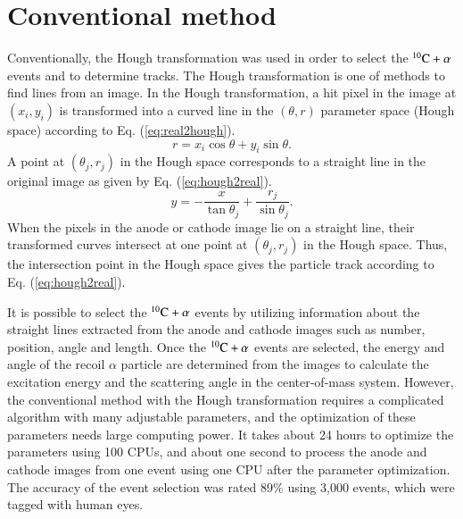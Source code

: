 \documentclass{jps-cp}
\begin{document}
\section{Conventional method}
Conventionally, the Hough transformation was used in order to
select the ${}^{10}\rm{C}+\alpha$ events and to determine tracks.
The Hough transformation is one of methods to find lines from an image.
In the Hough transformation, a hit pixel in the image at $(x_{i}, y_{i})$ is transformed into
a curved line in the $(\theta, r)$ parameter space (Hough space)
according to Eq. (\ref{eq:real2hough}).
\begin{equation}
  \label{eq:real2hough}
  r = x_{i}\cos\theta+y_{i}\sin\theta. 
\end{equation}
A point at $(\theta_{j}, r_{j})$ in the Hough space corresponds to a straight line
in the original image as given by Eq. (\ref{eq:hough2real}).
\begin{equation}
  \label{eq:hough2real}
  y = -\frac{x}{\tan\theta_{j}}+\frac{r_{j}}{\sin\theta_{j}}. 
\end{equation}
When the pixels in the anode or cathode image lie on a straight line,
their transformed curves intersect at one point at $(\theta_{j}, r_{j})$ in the Hough space.
Thus, the intersection point in the Hough space gives the particle track according to Eq. (\ref{eq:hough2real}).

It is possible to select the ${}^{10}\rm{C}+\alpha$ events by
utilizing information about the straight lines extracted from the anode and cathode images such as
number, position, angle and length.
Once the ${}^{10}\rm{C}+\alpha$ events are selected, the energy and angle of the recoil $\alpha$ particle
are determined from the images to calculate the excitation energy and the scattering angle in the center-of-mass system.
However, the conventional method with the Hough transformation requires a complicated algorithm with many adjustable parameters,
and the optimization of these parameters needs large computing power.
It takes about 24 hours to optimize the parameters using 100 CPUs, 
and about one second to process the anode and cathode images from one event using one CPU after the parameter optimization.
The accuracy of the event selection was rated 89\% using 3,000 events,
which were tagged with human eyes.
\end{document}
